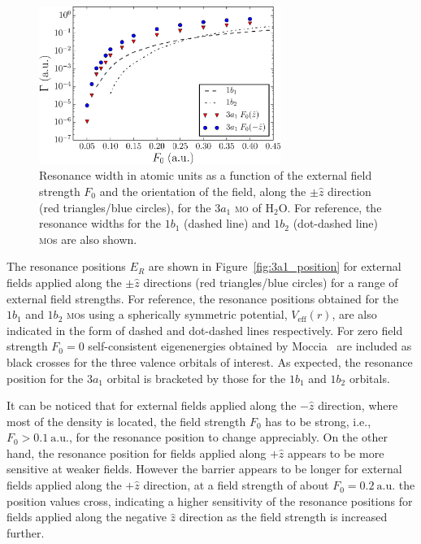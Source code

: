 \begin{figure}
  \centering
  \includegraphics[width=0.7\textwidth]{figures/ch_H2O/3a1/resWidthvsForbitals_compf32snew.eps}
  \caption{Resonance width in atomic units as a function of the
    external field strength $F_{0}$ and the orientation of the field,
    along the $\pm\hat{z}$ direction (red triangles/blue circles), for
    the $3a_{1}$ \textsc{mo} of H$_{2}$O. For reference, the resonance
    widths for the $1b_{1}$ (dashed line) and $1b_{2}$ (dot-dashed
    line) \textsc{mo}s are also shown.}
  \label{fig:3a1_width}
\end{figure}

The resonance positions $E_{R}$ are shown in
Figure~\ref{fig:3a1_position} for external fields applied along the
$\pm\hat{z}$ directions (red triangles/blue circles) for a range of
external field strengths. For reference, the resonance positions
obtained for the $1b_{1}$ and $1b_{2}$ \textsc{mo}s using a
spherically symmetric potential, $V_{\mathrm{eff}}(r)$, are also
indicated in the form of dashed and dot-dashed lines respectively. For
zero field strength $F_{0} = 0$ self-consistent eigenenergies obtained
by Moccia~\cite{Moccia_1964} are included as black crosses for the
three valence orbitals of interest. As expected, the resonance
position for the $3a_{1}$ orbital is bracketed by those for the
$1b_{1}$ and $1b_{2}$ orbitals.

It can be noticed that for external fields applied along the
$-\hat{z}$ direction, where most of the density is located, the field
strength $F_{0}$ has to be strong, i.e., $F_{0}>0.1\ \mathrm{a.u.}$,
for the resonance position to change appreciably. On the other hand,
the resonance position for fields applied along $+\hat{z}$ appears to
be more sensitive at weaker fields. However the barrier appears to be
longer for external fields applied along the $+\hat{z}$ direction, at
a field strength of about $F_{0} = 0.2\ \mathrm{a.u.}$ the position
values cross, indicating a higher sensitivity of the resonance
positions for fields applied along the negative $\hat{z}$ direction as
the field strength is increased further.

